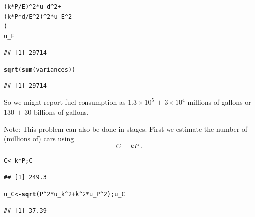 \documentclass[twoside]{book}\usepackage[]{graphicx}\usepackage[]{xcolor}
\makeatletter
\newcommand{\hlnum}[1]{\textcolor[rgb]{0.686,0.059,0.569}{#1}}%
\newcommand{\hlopt}[1]{\textcolor[rgb]{0,0,0}{#1}}%
\newcommand{\hlstd}[1]{\textcolor[rgb]{0.345,0.345,0.345}{#1}}%
\newcommand{\hlkwb}[1]{\textcolor[rgb]{0.69,0.353,0.396}{#1}}%
\newcommand{\hlkwd}[1]{\textcolor[rgb]{0.737,0.353,0.396}{\textbf{#1}}}%
\newenvironment{kframe}{%
 \def\at@end@of@kframe{}%
 \ifinner\ifhmode%
  \def\at@end@of@kframe{\end{minipage}}%
  \begin{minipage}{\columnwidth}%
 \fi\fi%
 \def\FrameCommand##1{\hskip\@totalleftmargin \hskip-\fboxsep
 \colorbox{shadecolor}{##1}\hskip-\fboxsep
     \hskip-\linewidth \hskip-\@totalleftmargin \hskip\columnwidth}%
 \MakeFramed {\advance\hsize-\width
   \@totalleftmargin\z@ \linewidth\hsize
   \@setminipage}}%
 {\par\unskip\endMakeFramed%
 \at@end@of@kframe}
\newenvironment{knitrout}{}{} %
\makeatother
\begin{document}
\begin{solution}
\begin{knitrout}
\begin{kframe}
\begin{alltt}
            \hlstd{(k}\hlopt{*}\hlstd{P}\hlopt{/}\hlstd{E)}\hlopt{^}\hlnum{2} \hlopt{*} \hlstd{u_d}\hlopt{^}\hlnum{2} \hlopt{+}
    \hlstd{(k} \hlopt{*} \hlstd{P} \hlopt{*} \hlstd{d}\hlopt{/}\hlstd{E}\hlopt{^}\hlnum{2}\hlstd{)}\hlopt{^}\hlnum{2} \hlopt{*} \hlstd{u_E}\hlopt{^}\hlnum{2}
    \hlstd{)}
\hlstd{u_F}
\end{alltt}
\begin{verbatim}
## [1] 29714
\end{verbatim}
\begin{alltt}
\hlkwd{sqrt}\hlstd{(}\hlkwd{sum}\hlstd{(variances))}
\end{alltt}
\begin{verbatim}
## [1] 29714
\end{verbatim}
\end{kframe}
\end{knitrout}
\noindent
So we might report fuel consumption as 
\ensuremath{1.3\times 10^{5}} $\pm$ 
\ensuremath{3\times 10^{4}} millions of gallons or 
130 $\pm$ 
30 billions of gallons.

Note: This problem can also be done in stages.  First we estimate the number 
of (millions of) cars using
\[
C = k P \;.
\]

\begin{knitrout}
\color{fgcolor}\begin{kframe}
\begin{alltt}
\hlstd{C} \hlkwb{<-} \hlstd{k} \hlopt{*} \hlstd{P; C}
\end{alltt}
\begin{verbatim}
## [1] 249.3
\end{verbatim}
\begin{alltt}
\hlstd{u_C} \hlkwb{<-} \hlkwd{sqrt}\hlstd{( P}\hlopt{^}\hlnum{2} \hlopt{*} \hlstd{u_k}\hlopt{^}\hlnum{2} \hlopt{+} \hlstd{k}\hlopt{^}\hlnum{2} \hlopt{*} \hlstd{u_P}\hlopt{^}\hlnum{2}\hlstd{); u_C}
\end{alltt}
\begin{verbatim}
## [1] 37.39
\end{verbatim}
\end{kframe}
\end{knitrout}


\end{solution}
\end{document}
